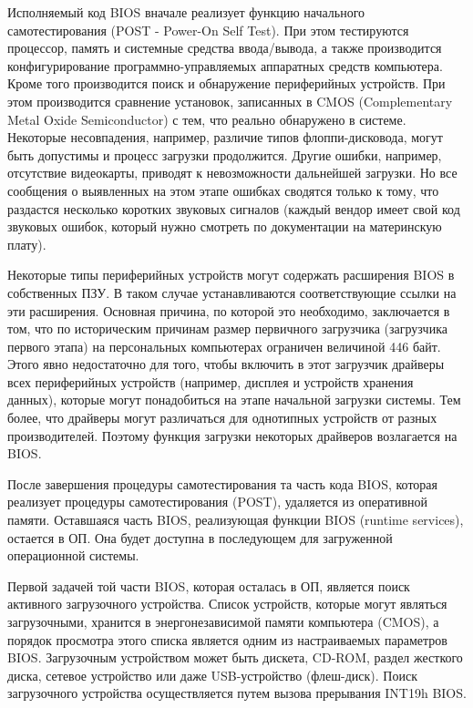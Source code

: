Исполняемый код BIOS вначале реализует функцию начального самотестирования (POST - Power-On Self Test). При этом тестируются процессор, память и системные средства ввода/вывода, а также производится конфигурирование программно-управляемых аппаратных средств компьютера. Кроме того производится поиск и обнаружение периферийных устройств. При этом производится сравнение установок, записанных в CMOS (Complementary Metal Oxide Semiconductor) с тем, что реально обнаружено в системе. Некоторые несовпадения, например, различие типов флоппи-дисковода, могут быть допустимы и процесс загрузки продолжится. Другие ошибки, например, отсутствие видеокарты, приводят к невозможности дальнейшей загрузки. Но все сообщения о выявленных на этом этапе ошибках сводятся только к тому, что раздастся несколько коротких звуковых сигналов (каждый вендор имеет свой код звуковых ошибок, который нужно смотреть по документации на материнскую плату).

Некоторые типы периферийных устройств могут содержать расширения BIOS в собственных ПЗУ. В таком случае устанавливаются соответствующие ссылки на эти расширения. Основная причина, по которой это необходимо, заключается в том, что по историческим причинам размер первичного загрузчика (загрузчика первого этапа) на персональных компьютерах ограничен величиной 446 байт. Этого явно недостаточно для того, чтобы включить в этот загрузчик драйверы всех периферийных устройств (например, дисплея и устройств хранения данных), которые могут понадобиться на этапе начальной загрузки системы. Тем более, что драйверы могут различаться для однотипных устройств от разных производителей. Поэтому функция загрузки некоторых драйверов возлагается на BIOS.

После завершения процедуры самотестирования та часть кода BIOS, которая реализует процедуры самотестирования (POST), удаляется из оперативной памяти. Оставшаяся часть BIOS, реализующая функции BIOS (runtime services), остается в ОП. Она будет доступна в последующем для загруженной операционной системы.

Первой задачей той части BIOS, которая осталась в ОП, является поиск активного загрузочного устройства. Список устройств, которые могут являться загрузочными, хранится в энергонезависимой памяти компьютера (CMOS), а порядок просмотра этого списка является одним из настраиваемых параметров BIOS. Загрузочным устройством может быть дискета, CD-ROM, раздел жесткого диска, сетевое устройство или даже USB-устройство (флеш-диск). Поиск загрузочного устройства осуществляется путем вызова прерывания INT19h BIOS.


